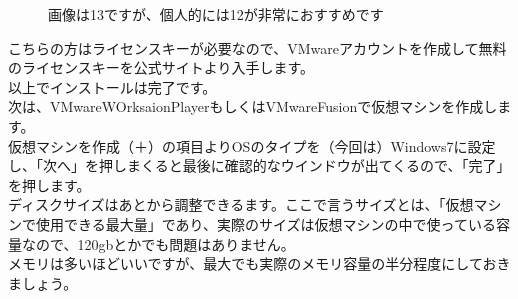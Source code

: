 \documentclass[b5paper,9pt,platex,dvipdfmx]{jsarticle}
\begin{document}
\begin{multicols*}{3}
\begin{figure}[H]
  \caption{画像は13ですが、個人的には12が非常におすすめです}
\end{figure}
こちらの方はライセンスキーが必要なので、VMwareアカウントを作成して無料のライセンスキーを公式サイトより入手します。\\
以上でインストールは完了です。\\
次は、VMwareWOrksaionPlayerもしくはVMwareFusionで仮想マシンを作成します。\\
仮想マシンを作成（＋）の項目よりOSのタイプを（今回は）Windows7に設定し、「次へ」を押しまくると最後に確認的なウインドウが出てくるので、「完了」を押します。\\
ディスクサイズはあとから調整できるます。ここで言うサイズとは、「仮想マシンで使用できる最大量」であり、実際のサイズは仮想マシンの中で使っている容量なので、120gbとかでも問題はありません。\\
メモリは多いほどいいですが、最大でも実際のメモリ容量の半分程度にしておきましょう。\\

\end{multicols*}
\end{document}
